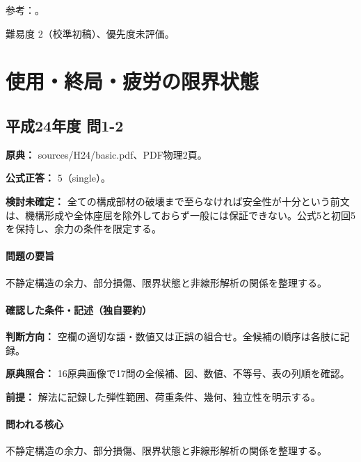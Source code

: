 \par 参考：\cite{struct_nims_data,struct_nasa_mean,struct_mit_beam}。

\par 難易度 2（校準初稿）、優先度未評価。

\section{使用・終局・疲労の限界状態}

\subsection{平成24年度 問1-2}
\label{q:h24-reg-basic-1-2}

\noindent\textbf{原典：} sources/H24/basic.pdf、PDF物理2頁。

\textbf{公式正答：} 5（single）。

\par\textbf{検討未確定：} 全ての構成部材の破壊まで至らなければ安全性が十分という前文は、機構形成や全体座屈を除外しておらず一般には保証できない。公式5と初回5を保持し、余力の条件を限定する。

\paragraph{問題の要旨} 不静定構造の余力、部分損傷、限界状態と非線形解析の関係を整理する。

\paragraph{確認した条件・記述（独自要約）}\mbox{}\par

\noindent\textbf{判断方向：} 空欄の適切な語・数値又は正誤の組合せ。全候補の順序は各肢に記録。\par

\noindent\textbf{原典照合：} 16原典画像で17問の全候補、図、数値、不等号、表の列順を確認。\par

\noindent\textbf{前提：} 解法に記録した弾性範囲、荷重条件、幾何、独立性を明示する。\par

\paragraph{問われる核心} 不静定構造の余力、部分損傷、限界状態と非線形解析の関係を整理する。

